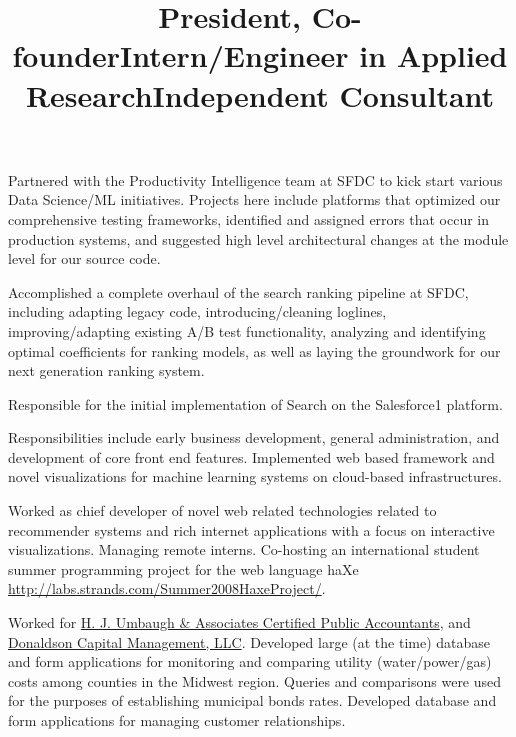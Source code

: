 \documentclass[overlapped,line,letterpaper]{res}
\begin{document}
\begin{resume}
\begin{position}
Partnered with the Productivity Intelligence team at SFDC to kick start various Data Science/ML initiatives.  Projects here include platforms that optimized our comprehensive testing frameworks, identified and assigned errors that occur in production systems,  and suggested high level architectural changes at the module level for our source code.

Accomplished a complete overhaul of the search ranking pipeline at SFDC, including adapting legacy code, introducing/cleaning loglines, improving/adapting existing A/B test functionality, analyzing and identifying optimal coefficients for ranking models, as well as laying the groundwork for our next generation ranking system.

Responsible for the initial implementation of Search on the Salesforce1 platform.

\end{position}

\title{President, Co-founder}
\begin{position}
Responsibilities include early business development, general administration, and development of core front end features. Implemented web based framework and novel visualizations for machine learning systems on cloud-based infrastructures.
\end{position}


\title{Intern/Engineer in Applied Research}
\begin{position}
Worked as chief developer of novel web related technologies related to recommender systems and rich internet applications with a focus on interactive visualizations.  Managing remote interns.  Co-hosting an international student summer programming project for the web language haXe \url{http://labs.strands.com/Summer2008HaxeProject/}.
\end{position}

\title{Independent Consultant}
\begin{position}
Worked for \href{http://www.hju.com}{H. J. Umbaugh \& Associates Certified Public Accountants}, and \href{http://www.dcmol.com}{Donaldson Capital Management, LLC}.
Developed large (at the time) database and form applications for monitoring and comparing utility (water/power/gas) costs among counties in the Midwest region.  Queries and comparisons were used for the purposes of establishing municipal bonds rates.
Developed database and form applications for managing customer relationships.


\end{position}
\end{resume}
\end{document}
